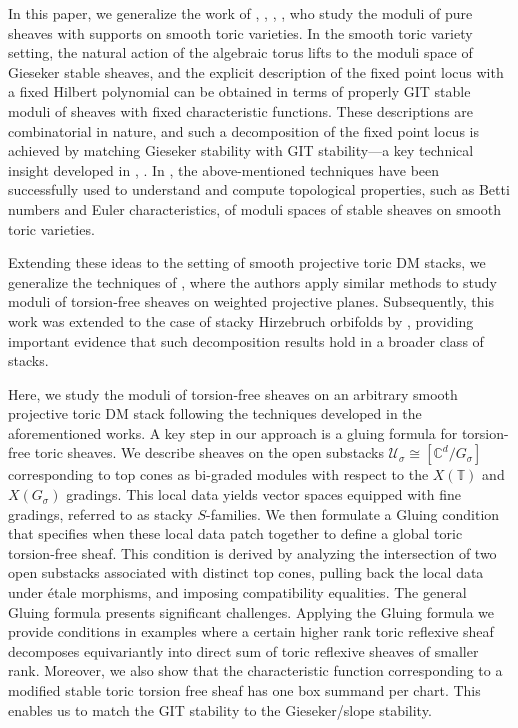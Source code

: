 \documentclass[10pt]{amsart}
\numberwithin{equation}{subsection}
\begin{document}
In this paper, we generalize the work of \cite{Kly}, \cite{Per}, \cite{Koo1}, \cite{Koo2}, who study the moduli of pure sheaves with supports on smooth toric varieties. In the smooth toric variety setting, the natural action of the algebraic torus lifts to the moduli space of Gieseker stable sheaves, and the explicit description of the fixed point locus with a fixed Hilbert polynomial can be obtained in terms of properly GIT stable moduli of sheaves with fixed characteristic functions. These descriptions are combinatorial in nature, and such a decomposition of the fixed point locus is achieved by matching Gieseker stability with GIT stability—a key technical insight developed in \cite{Koo1}, \cite{Koo2}. In \cite{Koo3}, the above-mentioned techniques have been successfully used to understand and compute topological properties, such as Betti numbers and Euler characteristics, of moduli spaces of stable sheaves on smooth toric varieties.

Extending these ideas to the setting of smooth projective toric DM stacks, we generalize the techniques of \cite{GJK}, where the authors apply similar methods to study moduli of torsion-free sheaves on weighted projective planes. Subsequently, this work was extended to the case of stacky Hirzebruch orbifolds by \cite{WW}, providing important evidence that such decomposition results hold in a broader class of stacks.

Here, we study the moduli of torsion-free sheaves on an arbitrary smooth projective toric DM stack following the techniques developed in the aforementioned works. A key step in our approach is a gluing formula for torsion-free toric sheaves. We describe sheaves on the open substacks $\mathscr{U_{\sigma}}\cong [{\mathbb{C}^d}/{G_{\sigma}}] $ corresponding to top cones as bi-graded modules with respect to the $X(\mathbb T)$ and $X(G_{\sigma})$ gradings. This local data yields vector spaces equipped with fine gradings, referred to as stacky $S$-families. We then formulate a Gluing condition that specifies when these local data patch together to define a global toric torsion-free sheaf. This condition is derived by analyzing the intersection of two open substacks associated with distinct top cones, pulling back the local data under étale morphisms, and imposing compatibility equalities. The general Gluing formula presents significant challenges. Applying the Gluing formula we provide conditions in examples where a certain higher rank toric reflexive sheaf decomposes equivariantly into direct sum of toric reflexive sheaves of smaller rank. Moreover, we also show that the characteristic function corresponding to a modified stable toric torsion free sheaf has one box summand per chart. This enables us to match the GIT stability to the Gieseker/slope stability.
\end{document}
